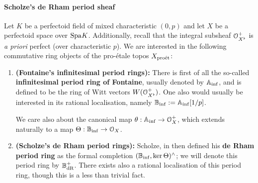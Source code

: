                 \paragraph{Scholze's de Rham period sheaf}
                    \begin{definition} \label{def: de_rham_period_sheaves}
                        Let $K$ be a perfectoid field of mixed characteristic $(0, p)$ and let $X$ be a perfectoid space over $\mathrm{Spa} K$. Additionally, recall that the integral subsheaf $\mathcal{O}_{X^{\flat}}^+$ is \textit{a priori} perfect (over characteristic $p$). We are interested in the following commutative ring objects of the pro-\'etale topos $X_{\mathrm{pro\acute{e}t}}$:
                            \begin{enumerate}
                                \item \textbf{(Fontaine's infinitesimal period rings):} There is first of all the so-called \textbf{infinitesimal period ring of Fontaine}, usually denoted by $\mathbb{A}_{\inf}$, and is defined to be the ring of Witt vectors $W(\mathcal{O}_{X^{\flat}}^+)$. One also would usually be interested in its rational localisation, namely $\mathbb{B}_{\inf} := \mathbb{A}_{\inf}[1/p]$. 
                                
                                We care also about the canonical map $\theta: \mathbb{A}_{\inf} \to \mathcal{O}_X^+$, which extends naturally to a map $\Theta: \mathbb{B}_{\inf} \to \mathcal{O}_X$.
                                \item \textbf{(Scholze's de Rham period rings):} Scholze, in \cite[Definition 6.1]{scholze2012padic} then defined his \textbf{de Rham period ring} as the formal completion $(\mathbb{B}_{\inf}, \ker \Theta)^{\wedge}$; we will denote this period ring by $\mathbb{B}_{\mathrm{dR}}^+$. There exists also a rational localisation of this period ring, though this is a less than trivial fact.
                            \end{enumerate}
                    \end{definition}
                    
